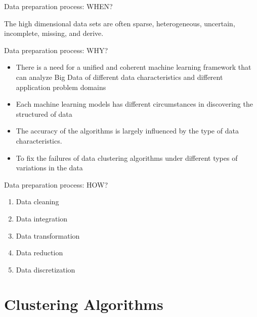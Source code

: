 \documentclass[compress,sky blue]{beamer}
\begin{document}
\begin{frame}{Data preparation process: WHEN?}

The high dimensional data sets are often sparse, heterogeneous, uncertain, incomplete, missing, and derive.

\end{frame}

\begin{frame}{Data preparation process: WHY?}

\begin{itemize}
\item There is a need for a unified and coherent machine learning framework that can analyze Big Data of different data characteristics and different application problem domains
\item Each machine learning models has different circumstances in discovering the structured of data
\item The accuracy of the algorithms is largely influenced by the type of data characteristics. 
\item To fix the failures of data clustering algorithms under different types of variations in the data
\end{itemize}


\end{frame}

\begin{frame}{Data preparation process: HOW?}

\begin{enumerate}
\item Data cleaning
\item Data integration
\item Data transformation
\item Data reduction
\item Data discretization
\end{enumerate}


\end{frame}


\section{Clustering Algorithms}
\end{document}

